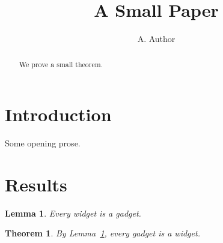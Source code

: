 \documentclass{article}
\title{A Small Paper}
\author{A. Author}
\newtheorem{theorem}{Theorem}
\newtheorem{lemma}{Lemma}
\begin{document}
\maketitle
\begin{abstract}
We prove a small theorem.
\end{abstract}
\section{Introduction}
Some opening prose.
\section{Results}
\begin{lemma}\label{lem:base}
Every widget is a gadget.
\end{lemma}
\begin{theorem}\label{thm:main}
By Lemma~\ref{lem:base}, every gadget is a widget.
\end{theorem}
\end{document}
